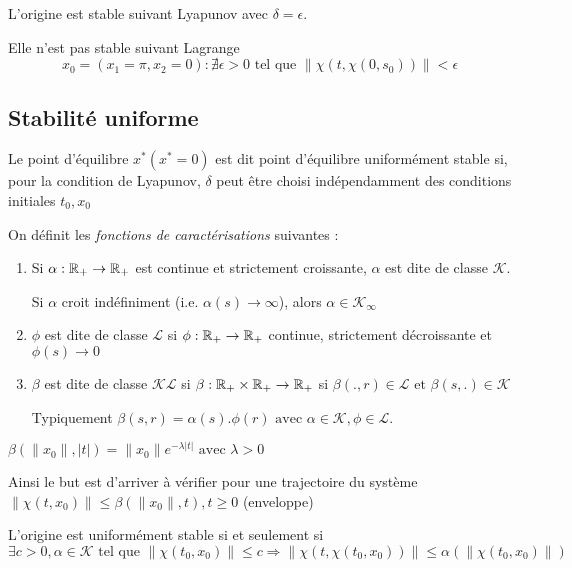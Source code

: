 \documentclass[main.tex]{subfiles} \newcommand{\D}{\mathcal{D}}
\newcommand{\Kc}{\mathcal{K}} \newcommand{\Lc}{\mathcal{L}}
\begin{document}
\begin{exemple} L'origine est stable suivant Lyapunov
	avec $\delta = \epsilon$.

  Elle n'est pas stable suivant Lagrange \[x_0=(x_1= \pi, x_2=0) : \nexists
\epsilon >0 \text{ tel que } \|\chi(t,\chi(0,s_0))\| < \epsilon \]
\end{exemple}

\subsection{Stabilité uniforme} \begin{defin} Le point d'équilibre $x^* (x^*
	=0)$ est dit point d'équilibre uniformément stable si, pour la condition de
	Lyapunov, $\delta$ peut être choisi indépendamment des conditions initiales
	$t_0,x_0$ \end{defin}


\begin{defin} On définit les \emph{fonctions de caractérisations} suivantes :
\begin{enumerate} \item Si $\alpha : \mathbb{R}_+ \rightarrow \mathbb{R}_+$ est continue et
			strictement croissante, $\alpha$ est dite de classe $\Kc$.

	Si $\alpha$ croit indéfiniment (i.e. $\alpha (s) \rightarrow \infty$),
		alors $\alpha\in \Kc_{\infty}$

  \item $\phi$ est dite de classe $\Lc$ si $\phi:\mathbb{R}_+\rightarrow\mathbb{R}_+$ continue,
	  strictement décroissante et $\phi(s) \rightarrow 0$

  \item $\beta$ est dite de classe $\Kc\Lc$ si $\beta:\mathbb{R}_+ \times \mathbb{R}_+
	  \rightarrow \mathbb{R}_+$ si $\beta(.,r)\in \Lc \text{ et } \beta(s,.) \in \Kc$

	Typiquement $\beta(s,r)=\alpha(s).\phi(r) \text{ avec } \alpha\in\Kc, \phi
\in \Lc$.  \end{enumerate} \end{defin}

\begin{exemple} $\beta(\|x_0\|,|t|)=\|x_0\|e^{-\lambda |t|} \text{ avec }
	\lambda >0$

  Ainsi le but est d'arriver à vérifier pour une trajectoire du système $
\|\chi(t,x_0)\| \leq \beta(\|x_0\|,t),t \geq 0$ (enveloppe) \end{exemple}

\begin{prop} L'origine est uniformément stable si et seulement si \[\exists
c>0, \alpha \in \Kc \text{ tel que } \|\chi(t_0,x_0)\| \leq c \Rightarrow
\|\chi(t,\chi(t_0,x_0))\| \leq \alpha (\|\chi(t_0,x_0)\|)\] \end{prop}
\end{document}
